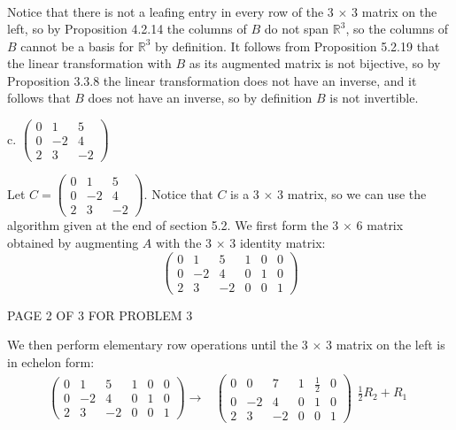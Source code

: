 \documentclass[12pt]{article}
\newenvironment{problem}[2][Problem]
{
	\begin{trivlist} 
		\item[\hskip \labelsep {\bfseries #1 #2:}]
	}
{
	\end{trivlist}
	}
\newenvironment{solution}[1][Solution]
{
	\begin{trivlist} 
		\item[\hskip \labelsep {\itshape #1:}]
	}
	{
	\end{trivlist}
}
\begin{document}
\begin{problem}{5}
\begin{solution}
\begin{align*}
\end{align*}
Notice that there is not a leafing entry in every row of the 3 $\times$ 3 matrix on the left, so by Proposition 4.2.14 the columns of $B$ do not span $\mathbb{R}^3$, so the columns of $B$ cannot be a basis for $\mathbb{R}^3$ by definition. It follows from Proposition 5.2.19 that the linear transformation with $B$ as its augmented matrix is not bijective, so by Proposition 3.3.8 the linear transformation does not have an inverse, and it follows that $B$ does not have an inverse, so by definition $B$ is not invertible.
\end{solution}
%
\noindent
\newline
\newline
c. $\begin{pmatrix} 0&1&5\\0&-2&4\\2&3&-2 \end{pmatrix}$
\begin{solution}
Let $C=\begin{pmatrix} 0&1&5\\0&-2&4\\2&3&-2 \end{pmatrix}$. Notice that $C$ is a 3 $\times$ 3 matrix, so we can use the algorithm given at the end of section 5.2. We first form the 3 $\times$ 6 matrix obtained by augmenting $A$ with the 3 $\times$ 3 identity matrix:
\[
\begin{pmatrix} 0&1&5&1&0&0\\0&-2&4&0&1&0\\2&3&-2&0&0&1 \end{pmatrix}
\]
\vfill
\centerline{PAGE 2 OF 3 FOR PROBLEM 3}
We then perform elementary row operations until the 3 $\times$ 3 matrix on the left is in echelon form:
\begin{align*}
\begin{pmatrix} 0&1&5&1&0&0\\0&-2&4&0&1&0\\2&3&-2&0&0&1 \end{pmatrix} \rightarrow & \begin{pmatrix} 0&0&7&1&\frac{1}{2}&0\\0&-2&4&0&1&0\\2&3&-2&0&0&1 \end{pmatrix} \begin{matrix} \frac{1}{2}R_2+R_1 \text{} \\ \text{} \\ \text{} \end{matrix} \\

\end{align*}
\end{solution}
\end{problem}
\end{document}
